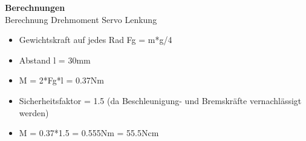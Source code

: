 \textbf{Berechnungen}\\[0.2cm]
Berechnung Drehmoment Servo Lenkung
\begin{itemize}
\item Gewichtskraft auf jedes Rad Fg = m*g/4
\item Abstand l = 30mm
\item M = 2*Fg*l = 0.37Nm
\item Sicherheitsfaktor = 1.5 (da Beschleunigung- und Bremskräfte vernachlässigt werden)
\item M = 0.37*1.5 = 0.555Nm = 55.5Ncm
\end{itemize}